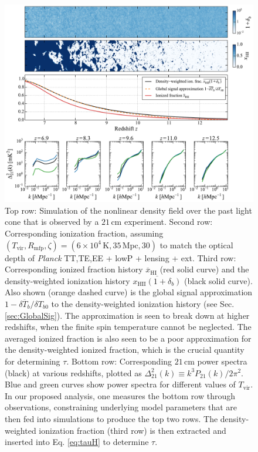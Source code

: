 \documentclass[twocolumn,aps,prd,nofootinbib,showpacs,superscriptaddress]{revtex4-1}
\begin{document}
\begin{figure}[!]
	\centering
	\includegraphics[width=1.0\textwidth]{figures/lightcones.pdf}
	\caption{Top row: Simulation of the nonlinear density field over the past light cone that is observed by a $21\,\textrm{cm}$ experiment. Second row: Corresponding ionization fraction, assuming $(T_\textrm{vir}, R_\textrm{mfp}, \zeta) = (6 \times 10^4\,\textrm{K}, 35\,\textrm{Mpc}, 30)$ to match the optical depth of \emph{Planck} TT,TE,EE + lowP + lensing + ext. Third row: Corresponding ionized fraction history $\overline{x}_\textrm{HI}$ (red solid curve) and the density-weighted ionization history $\overline{x_\textrm{HII} (1+ \delta_b)}$ (black solid curve). Also shown (orange dashed curve) is the global signal approximation $1 - \overline{\delta T_b} / \delta T_{b0}$ to the density-weighted ionization history (see Sec. \ref{sec:GlobalSig}). The approximation is seen to break down at higher redshifts, when the finite spin temperature cannot be neglected. The averaged ionized fraction is also seen to be a poor approximation for the density-weighted ionized fraction, which is the crucial quantity for determining $\tau$. Bottom row: Corresponding $21\,\textrm{cm}$ power spectra (black) at various redshifts, plotted as $\Delta^2_{21} (k) \equiv k^3 P_{21}(k) / 2 \pi^2$. Blue and green curves show power spectra for different values of $T_\textrm{vir}$. In our proposed analysis, one measures the bottom row through observations, constraining underlying model parameters that are then fed into simulations to produce the top two rows. The density-weighted ionization fraction (third row) is then extracted and inserted into Eq. \eqref{eq:tauH} to determine $\tau$.}
	\label{fig:Simulations}
\end{figure}
\end{document}
